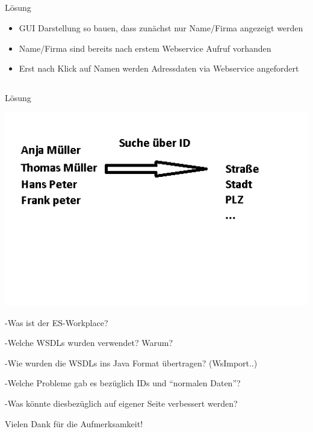 \documentclass[xcolor={usenames,dvipsnames}, compress, 10pt]{beamer}
\begin{document}
\subsection*{}

\begin{frame}{Lösung}
\begin{center}

\begin{itemize}
\item GUI Darstellung so bauen, dass zunächst nur Name/Firma angezeigt werden
\item Name/Firma sind bereits nach erstem Webservice Aufruf vorhanden
\item Erst nach Klick auf Namen werden Adressdaten via Webservice angefordert
\end{itemize}

\end{center}
\end{frame}

\subsection*{}

\begin{frame}{Lösung}
\begin{center}


\includegraphics[width=\textheight]{Bilder/presi2.jpg} 

\end{center}
\end{frame}

-Was ist der ES-Workplace?

-Welche WSDLs wurden verwendet? Warum?

-Wie wurden die WSDLs ins Java Format übertragen? (WsImport..)

-Welche Probleme gab es bezüglich IDs und ``normalen Daten''?

-Was könnte diesbezüglich auf eigener Seite verbessert werden?



\begin{frame}
\begin{center}
Vielen Dank f\"ur die Aufmerksamkeit!
\end{center}
\end{frame}
\end{document}
